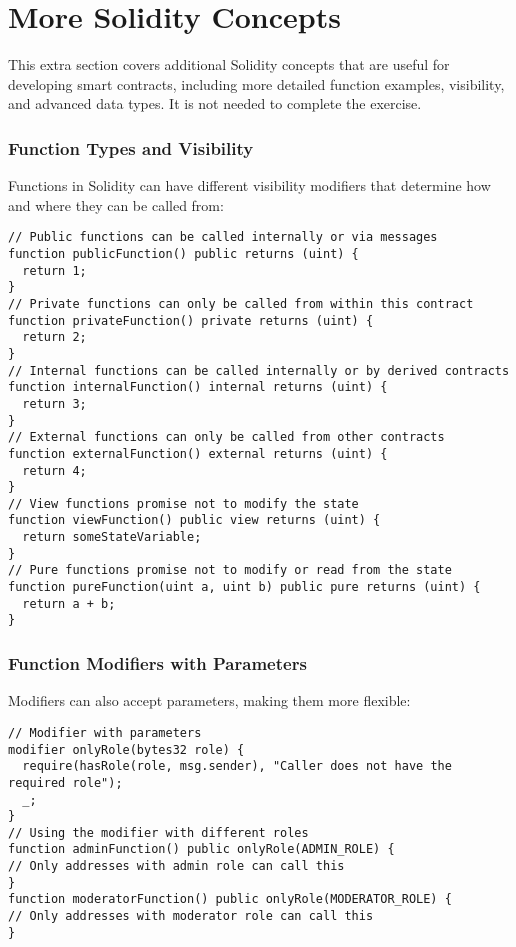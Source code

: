 \documentclass[12pt]{article}
\begin{document}
\pagebreak
\section{More Solidity Concepts}

This extra section covers additional Solidity concepts that are useful for
developing smart contracts, including more detailed function examples,
visibility, and advanced data types. It is not needed to complete the exercise.

\subsubsection*{Function Types and Visibility}
Functions in Solidity can have different visibility modifiers that determine how and where they can be called from:

\noindent
\begin{minipage}[c]{\textwidth}
  \begin{lstlisting}[language=Solidity]
// Public functions can be called internally or via messages
function publicFunction() public returns (uint) {
  return 1;
}
// Private functions can only be called from within this contract
function privateFunction() private returns (uint) {
  return 2;
}
// Internal functions can be called internally or by derived contracts
function internalFunction() internal returns (uint) {
  return 3;
}
// External functions can only be called from other contracts
function externalFunction() external returns (uint) {
  return 4;
}
// View functions promise not to modify the state
function viewFunction() public view returns (uint) {
  return someStateVariable;
}
// Pure functions promise not to modify or read from the state
function pureFunction(uint a, uint b) public pure returns (uint) {
  return a + b;
}
\end{lstlisting}
\end{minipage}

\subsubsection*{Function Modifiers with Parameters}

Modifiers can also accept parameters, making them more flexible:

\noindent
\begin{minipage}[c]{\textwidth}
  \begin{lstlisting}[language=Solidity]
// Modifier with parameters
modifier onlyRole(bytes32 role) {
  require(hasRole(role, msg.sender), "Caller does not have the required role");
  _;
}
// Using the modifier with different roles
function adminFunction() public onlyRole(ADMIN_ROLE) {
// Only addresses with admin role can call this
}
function moderatorFunction() public onlyRole(MODERATOR_ROLE) {
// Only addresses with moderator role can call this
}
\end{lstlisting}
\end{minipage}
\end{document}
